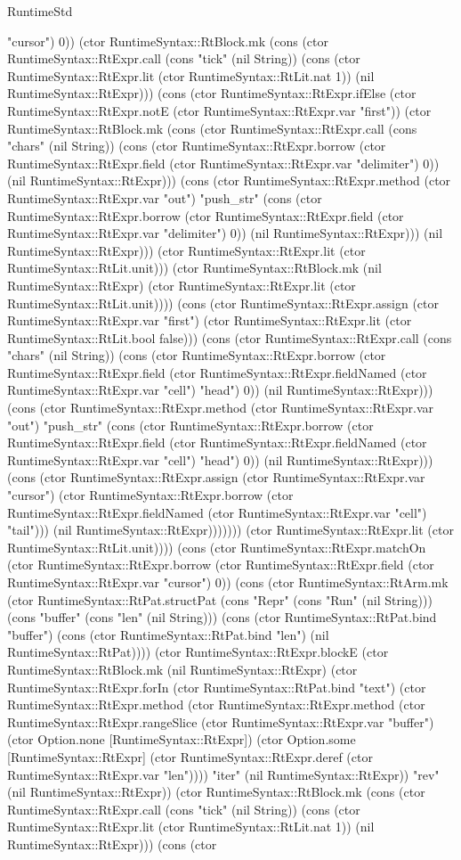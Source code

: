 \begin{lexlean}{RuntimeStd}
\begin{semanticmodule}
{"cursor") 0)) (ctor RuntimeSyntax::RtBlock.mk (cons (ctor RuntimeSyntax::RtExpr.call (cons "tick" (nil String)) (cons (ctor RuntimeSyntax::RtExpr.lit (ctor RuntimeSyntax::RtLit.nat 1)) (nil RuntimeSyntax::RtExpr))) (cons (ctor RuntimeSyntax::RtExpr.ifElse (ctor RuntimeSyntax::RtExpr.notE (ctor RuntimeSyntax::RtExpr.var "first")) (ctor RuntimeSyntax::RtBlock.mk (cons (ctor RuntimeSyntax::RtExpr.call (cons "chars" (nil String)) (cons (ctor RuntimeSyntax::RtExpr.borrow (ctor RuntimeSyntax::RtExpr.field (ctor RuntimeSyntax::RtExpr.var "delimiter") 0)) (nil RuntimeSyntax::RtExpr))) (cons (ctor RuntimeSyntax::RtExpr.method (ctor RuntimeSyntax::RtExpr.var "out") "push_str" (cons (ctor RuntimeSyntax::RtExpr.borrow (ctor RuntimeSyntax::RtExpr.field (ctor RuntimeSyntax::RtExpr.var "delimiter") 0)) (nil RuntimeSyntax::RtExpr))) (nil RuntimeSyntax::RtExpr))) (ctor RuntimeSyntax::RtExpr.lit (ctor RuntimeSyntax::RtLit.unit))) (ctor RuntimeSyntax::RtBlock.mk (nil RuntimeSyntax::RtExpr) (ctor RuntimeSyntax::RtExpr.lit (ctor RuntimeSyntax::RtLit.unit)))) (cons (ctor RuntimeSyntax::RtExpr.assign (ctor RuntimeSyntax::RtExpr.var "first") (ctor RuntimeSyntax::RtExpr.lit (ctor RuntimeSyntax::RtLit.bool false))) (cons (ctor RuntimeSyntax::RtExpr.call (cons "chars" (nil String)) (cons (ctor RuntimeSyntax::RtExpr.borrow (ctor RuntimeSyntax::RtExpr.field (ctor RuntimeSyntax::RtExpr.fieldNamed (ctor RuntimeSyntax::RtExpr.var "cell") "head") 0)) (nil RuntimeSyntax::RtExpr))) (cons (ctor RuntimeSyntax::RtExpr.method (ctor RuntimeSyntax::RtExpr.var "out") "push_str" (cons (ctor RuntimeSyntax::RtExpr.borrow (ctor RuntimeSyntax::RtExpr.field (ctor RuntimeSyntax::RtExpr.fieldNamed (ctor RuntimeSyntax::RtExpr.var "cell") "head") 0)) (nil RuntimeSyntax::RtExpr))) (cons (ctor RuntimeSyntax::RtExpr.assign (ctor RuntimeSyntax::RtExpr.var "cursor") (ctor RuntimeSyntax::RtExpr.borrow (ctor RuntimeSyntax::RtExpr.fieldNamed (ctor RuntimeSyntax::RtExpr.var "cell") "tail"))) (nil RuntimeSyntax::RtExpr))))))) (ctor RuntimeSyntax::RtExpr.lit (ctor RuntimeSyntax::RtLit.unit)))) (cons (ctor RuntimeSyntax::RtExpr.matchOn (ctor RuntimeSyntax::RtExpr.borrow (ctor RuntimeSyntax::RtExpr.field (ctor RuntimeSyntax::RtExpr.var "cursor") 0)) (cons (ctor RuntimeSyntax::RtArm.mk (ctor RuntimeSyntax::RtPat.structPat (cons "Repr" (cons "Run" (nil String))) (cons "buffer" (cons "len" (nil String))) (cons (ctor RuntimeSyntax::RtPat.bind "buffer") (cons (ctor RuntimeSyntax::RtPat.bind "len") (nil RuntimeSyntax::RtPat)))) (ctor RuntimeSyntax::RtExpr.blockE (ctor RuntimeSyntax::RtBlock.mk (nil RuntimeSyntax::RtExpr) (ctor RuntimeSyntax::RtExpr.forIn (ctor RuntimeSyntax::RtPat.bind "text") (ctor RuntimeSyntax::RtExpr.method (ctor RuntimeSyntax::RtExpr.method (ctor RuntimeSyntax::RtExpr.rangeSlice (ctor RuntimeSyntax::RtExpr.var "buffer") (ctor Option.none [RuntimeSyntax::RtExpr]) (ctor Option.some [RuntimeSyntax::RtExpr] (ctor RuntimeSyntax::RtExpr.deref (ctor RuntimeSyntax::RtExpr.var "len")))) "iter" (nil RuntimeSyntax::RtExpr)) "rev" (nil RuntimeSyntax::RtExpr)) (ctor RuntimeSyntax::RtBlock.mk (cons (ctor RuntimeSyntax::RtExpr.call (cons "tick" (nil String)) (cons (ctor RuntimeSyntax::RtExpr.lit (ctor RuntimeSyntax::RtLit.nat 1)) (nil RuntimeSyntax::RtExpr))) (cons (ctor }
\end{semanticmodule}
\end{lexlean}
